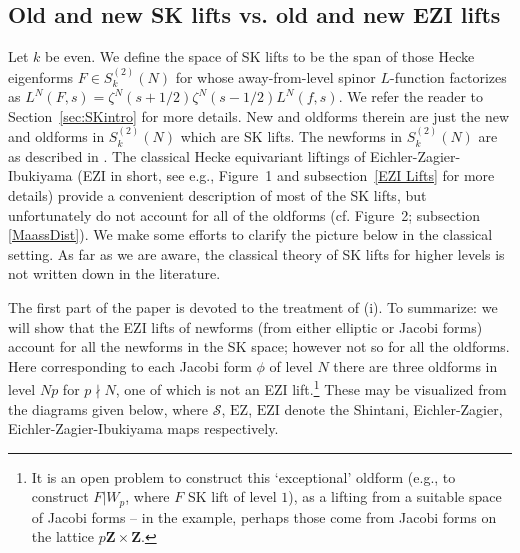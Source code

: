 \documentclass[11pt]{amsart}
\numberwithin{equation}{section}
\theoremstyle{plain}
\theoremstyle{definition}
\newcommand{\z}{\mf Z}
\newcommand{\mf}{\mathbf}
\newcommand{\mc}{\mathcal}
\newcommand{\mrm}{\mathrm}
\newcommand{\sktwon}{S_k^{(2)}(N)}
\newcommand{\stwon}{S^{(2)}_k(N)}
\begin{document}
\subsection{Old and new SK lifts vs. old and new EZI lifts}
Let  $k$ be even. We define the space of SK lifts to be the span of those Hecke eigenforms $F \in \sktwon$ for whose away-from-level spinor $L$-function factorizes as $\displaystyle L^N(F,s)= \zeta^N(s+1/2)\zeta^N(s-1/2)L^N(f,s)$. We refer the reader to Section~\ref{sec:SKintro} for more details. New and oldforms therein are just the new and oldforms in $\stwon$ which are SK lifts. The newforms in $\sktwon$ are as described in \cite{schmidt-AL}.
The classical Hecke equivariant liftings of Eichler-Zagier-Ibukiyama (EZI in short, see e.g., Figure~1 and subsection~\ref{EZI Lifts} for more details) provide a convenient description of most of the SK lifts, but unfortunately do not account for all of the oldforms (cf. Figure~2; subsection \ref{MaassDist}). We make some efforts to clarify the picture below in the classical setting.
As far as we are aware, the classical theory of SK lifts for higher levels is not written down in the literature.

The first part of the paper is devoted to the treatment of (i). To summarize: we will show that the EZI lifts of newforms (from either elliptic or Jacobi forms) account for all the newforms in the SK space; however not so for all the oldforms. Here corresponding to each Jacobi form $\phi$ of level $N$ there are three oldforms in level $Np$ for $p \nmid N$, one of which is not an EZI lift.\footnote{It is an open problem to construct this `exceptional' oldform (e.g., to construct $F|W_p$, where $F$ SK lift of level $1$), as a lifting from a suitable space of Jacobi forms -- in the example, perhaps those come from Jacobi forms on the lattice $p\z \times\z$.} These may be visualized from the diagrams given below, where $\mc S$, $\mrm{EZ}$, $\mrm{EZI}$ denote the Shintani, Eichler-Zagier, Eichler-Zagier-Ibukiyama maps respectively.
\end{document}
